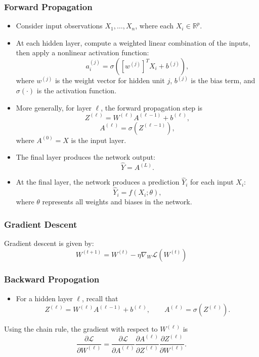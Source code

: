 \documentclass{article}
\begin{document}
\subsubsection{Forward Propagation}
\begin{itemize}
    \item Consider input observations $X_1, \dots, X_n$, where each $X_i \in \mathbb{R}^p$.
    
    \item At each hidden layer, compute a weighted linear combination of the inputs, then apply a nonlinear activation function:
    \[
        a_i^{(j)} = \sigma\left(\left[w^{(j)}\right]^T X_i + b^{(j)}\right),
    \]
    where $w^{(j)}$ is the weight vector for hidden unit $j$, $b^{(j)}$ is the bias term, and $\sigma(\cdot)$ is the activation function.
    
    \item More generally, for layer $\ell$, the forward propagation step is
    \[
        Z^{(\ell)} = W^{(\ell)}A^{(\ell - 1)} + b^{(\ell)},
    \]
    \[
        A^{(\ell)} = \sigma\left(Z^{(\ell - 1)}\right),
    \]
    where $A^{(0)} = X$ is the input layer.
    
    \item The final layer produces the network output:
    \[
        \hat{Y} = A^{(L)}.
    \]
    \item At the final layer, the network produces a prediction $\hat{Y}_i$ for each input $X_i$:
    \[
        \hat{Y}_i = f(X_i; \theta),
    \]
where $\theta$ represents all weights and biases in the network.
\end{itemize}

\subsubsection{Gradient Descent}
Gradient descent is given by:
\[
    W^{(t+1)}
    =
    W^{(t)}
    -
    \eta \nabla_{W}\mathcal{L}\left(W^{(t)}\right)
\]
\subsubsection{Backward Propogation}
\begin{itemize}
\item For a hidden layer $\ell$, recall that
\[
    Z^{(\ell)} = W^{(\ell)}A^{(\ell - 1)} + b^{(\ell)},
    \qquad
    A^{(\ell)} = \sigma\left(Z^{(\ell)}\right).
\]
\end{itemize}
Using the chain rule, the gradient with respect to $W^{(\ell)}$ is
\[
    \frac{\partial \mathcal{L}}{\partial W^{(\ell)}}
    =
    \frac{\partial \mathcal{L}}{\partial A^{(\ell)}}
    \frac{\partial A^{(\ell)}}{\partial Z^{(\ell)}}
    \frac{\partial Z^{(\ell)}}{\partial W^{(\ell)}}.
\]
\end{document}
